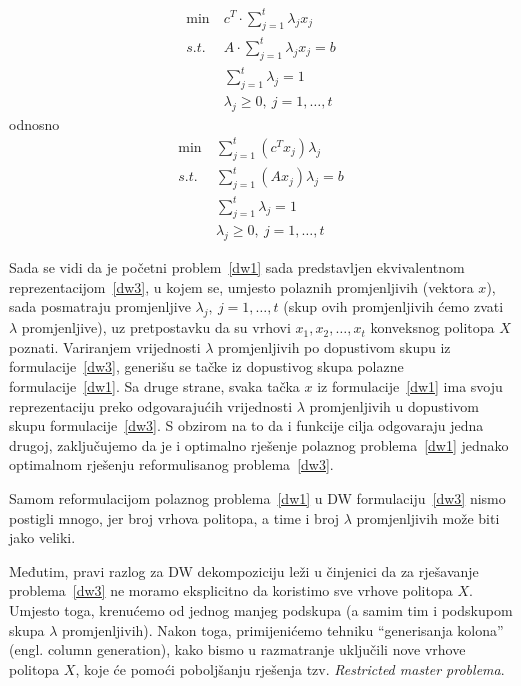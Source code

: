 \documentclass[a4paper, utf8, 11pt, colorlinks]{book}
\begin{document}
 
   \begin{equation}
 	\begin{aligned}\label{dw2}
 		\min\  &c^T\cdot \sum_{j=1}^t\lambda_jx_j\\
 		s.t.\  &A\cdot \sum_{j=1}^t\lambda_jx_j=b\\
 		 		 &\sum_{j=1}^t\lambda_j = 1\\
 		&\lambda_j\geqslant 0,\ j = 1,\ldots,t
 	\end{aligned}
 \end{equation}
odnosno
    \begin{equation}
 	\begin{aligned}\label{dw3}
 		\min\  & \sum_{j=1}^t(c^T x_j)\lambda_j\\
 		s.t.\  &\sum_{j=1}^t (A x_j)\lambda_j=b\\
 		&\sum_{j=1}^t\lambda_j = 1\\
 		&\lambda_j\geqslant 0,\ j = 1,\ldots,t
 	\end{aligned}
 \end{equation}
 
 Sada se vidi da je početni problem~\ref{dw1} sada predstavljen ekvivalentnom reprezentacijom~\ref{dw3}, u kojem se, umjesto polaznih promjenljivih (vektora $x$), sada posmatraju promjenljive $\lambda_j,\ j = 1,\ldots,t$ (skup ovih promjenljivih ćemo zvati $\lambda$ promjenljive), uz pretpostavku da su  vrhovi $x_1,x_2,\dots,x_t$ konveksnog politopa $X$ poznati. Variranjem vrijednosti $\lambda$ promjenljivih po dopustivom skupu iz formulacije~\ref{dw3}, generišu se tačke iz dopustivog skupa polazne formulacije~\ref{dw1}. Sa druge strane, svaka tačka $x$ iz formulacije~\ref{dw1} ima svoju reprezentaciju preko odgovarajućih vrijednosti  $\lambda$ promjenljivih u dopustivom skupu formulacije~\ref{dw3}. S obzirom na to da i funkcije cilja odgovaraju jedna drugoj, zaključujemo da je i optimalno rješenje polaznog problema~\ref{dw1} jednako optimalnom rješenju reformulisanog problema~\ref{dw3}.
 
 Samom reformulacijom polaznog problema~\ref{dw1} u DW formulaciju~\ref{dw3} nismo postigli mnogo, jer broj vrhova politopa, a time i broj $\lambda$ promjenljivih može biti jako veliki.
 
 Međutim, pravi razlog za DW dekompoziciju leži u činjenici da za rješavanje problema~\ref{dw3} ne moramo eksplicitno da koristimo sve vrhove politopa $X$. Umjesto toga, krenućemo od jednog   manjeg podskupa (a samim tim i podskupom skupa $\lambda$ promjenljivih). Nakon toga, primijenićemo tehniku ``generisanja kolona'' (engl. column generation), kako bismo u razmatranje uključili nove vrhove politopa $X$, koje će pomoći poboljšanju rješenja tzv. \emph{Restricted master problema}.
 
\end{document}
